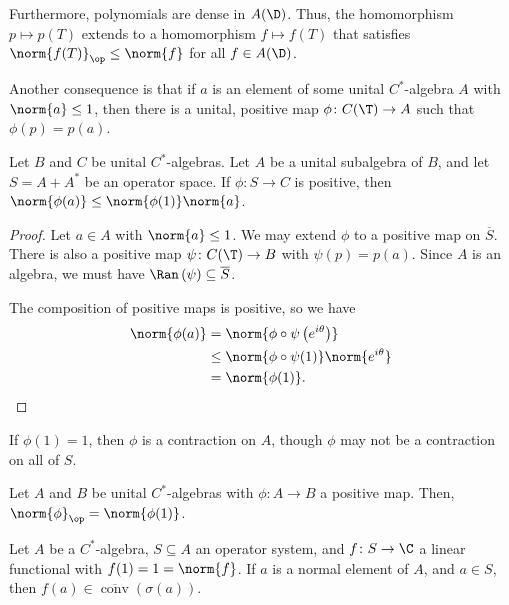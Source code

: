 \documentclass[10pt]{mypackage}
\begin{document}
Furthermore, polynomials are dense in $A(\D)$. Thus, the homomorphism $p\mapsto p(T)$ extends to a homomorphism $f\mapsto f(T)$ that satisfies $\norm{f(T)}_{\op}\leq \norm{f}$ for all $f\in A(\D)$.\newline

Another consequence is that if $a$ is an element of some unital $C^{\ast}$-algebra $A$ with $\norm{a}\leq 1$, then there is a unital, positive map $\phi\colon C(\T)\rightarrow A$ such that $\phi(p) = p(a)$.
\begin{corollary}
  Let $B$ and $C$ be unital $C^{\ast}$-algebras. Let $A$ be a unital subalgebra of $B$, and let $S = A + A^{\ast}$ be an operator space. If $\phi\colon S\rightarrow C$ is positive, then $\norm{\phi(a)}\leq \norm{\phi(1)}\norm{a}$.
\end{corollary}
\begin{proof}
  Let $a\in A$ with $\norm{a}\leq 1$. We may extend $\phi$ to a positive map on $\overline{S}$. There is also a positive map $\psi\colon C(\T)\rightarrow B$ with $\psi\left( p \right) = p(a)$. Since $A$ is an algebra, we must have $\Ran\left( \psi \right)\subseteq \overline{S}$.\newline

  The composition of positive maps is positive, so we have
  \begin{align*}
    \norm{\phi(a)} &= \norm{\phi\circ\psi\left( e^{i\theta} \right)}\\
                   &\leq \norm{\phi\circ \psi(1)}\norm{e^{i\theta}}\\
                   &= \norm{\phi(1)}.
  \end{align*}
\end{proof}
If $\phi(1) = 1$, then $\phi$ is a contraction on $A$, though $\phi$ may not be a contraction on all of $S$.
\begin{corollary}
  Let $A$ and $B$ be unital $C^{\ast}$-algebras with $\phi\colon A\rightarrow B$ a positive map. Then, $\norm{\phi}_{\op}= \norm{\phi(1)}$.
\end{corollary}
\begin{lemma}
  Let $A$ be a $C^{\ast}$-algebra, $S\subseteq A$ an operator system, and $f\colon S\rightarrow \C$ a linear functional with $f(1) = 1 = \norm{f}$. If $a$ is a normal element of $A$, and $a\in S$, then $f(a)\in \overline{\operatorname{conv}}\left( \sigma\left( a \right) \right)$.
\end{lemma}
\end{document}

